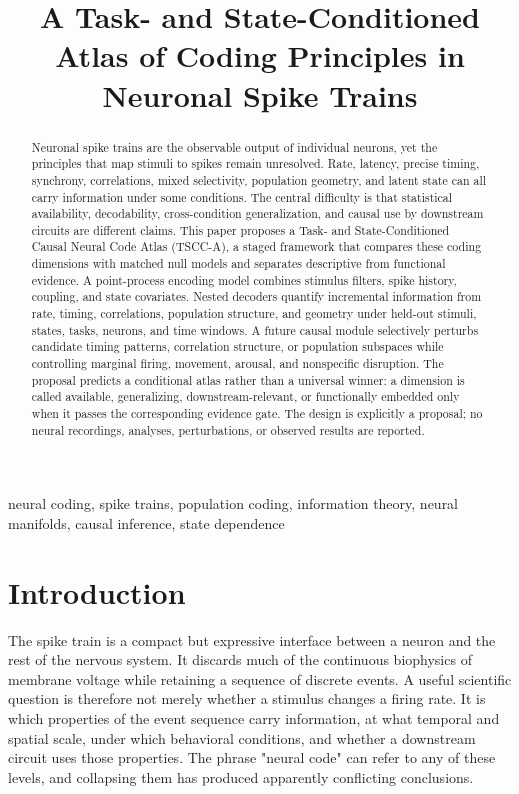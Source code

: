 \documentclass[conference]{IEEEtran}
\title{A Task- and State-Conditioned Atlas of Coding Principles in Neuronal Spike Trains}
\author{\IEEEauthorblockN{Research Proposal}}
\begin{document}
\maketitle

\begin{abstract}
Neuronal spike trains are the observable output of individual neurons, yet the principles that map stimuli to spikes remain unresolved. Rate, latency, precise timing, synchrony, correlations, mixed selectivity, population geometry, and latent state can all carry information under some conditions. The central difficulty is that statistical availability, decodability, cross-condition generalization, and causal use by downstream circuits are different claims. This paper proposes a Task- and State-Conditioned Causal Neural Code Atlas (TSCC-A), a staged framework that compares these coding dimensions with matched null models and separates descriptive from functional evidence. A point-process encoding model combines stimulus filters, spike history, coupling, and state covariates. Nested decoders quantify incremental information from rate, timing, correlations, population structure, and geometry under held-out stimuli, states, tasks, neurons, and time windows. A future causal module selectively perturbs candidate timing patterns, correlation structure, or population subspaces while controlling marginal firing, movement, arousal, and nonspecific disruption. The proposal predicts a conditional atlas rather than a universal winner: a dimension is called available, generalizing, downstream-relevant, or functionally embedded only when it passes the corresponding evidence gate. The design is explicitly a proposal; no neural recordings, analyses, perturbations, or observed results are reported.
\end{abstract}

\begin{IEEEkeywords}
neural coding, spike trains, population coding, information theory, neural manifolds, causal inference, state dependence
\end{IEEEkeywords}

\section{Introduction}
The spike train is a compact but expressive interface between a neuron and the rest of the nervous system. It discards much of the continuous biophysics of membrane voltage while retaining a sequence of discrete events. A useful scientific question is therefore not merely whether a stimulus changes a firing rate. It is which properties of the event sequence carry information, at what temporal and spatial scale, under which behavioral conditions, and whether a downstream circuit uses those properties. The phrase "neural code" can refer to any of these levels, and collapsing them has produced apparently conflicting conclusions.
\end{document}
